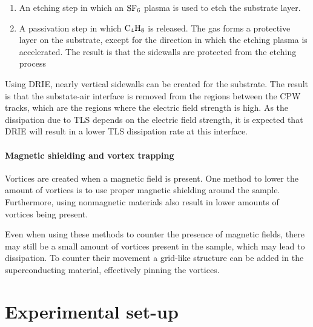   \begin{enumerate}
      \item An etching step in which an $\mathrm{SF_6}$ plasma is used to etch the substrate layer.
      \item A passivation step in which $\mathrm{C_4H_8}$ is released. The gas forms a protective layer on the substrate, except for the direction in which the etching plasma is accelerated. The result is that the sidewalls are protected from the etching process
  \end{enumerate}

  Using DRIE, nearly vertical sidewalls can be created for the substrate. The result is that the substate-air interface is removed from the regions between the CPW tracks, which are the regions where the electric field strength is high. As the dissipation due to TLS depends on the electric field strength, it is expected that DRIE will result in a lower TLS dissipation rate at this interface.

  \subsubsection{Magnetic shielding and vortex trapping}

  Vortices are created when a magnetic field is present. One method to lower the amount of vortices is to use proper magnetic shielding around the sample. Furthermore, using nonmagnetic materials also result in lower amounts of vortices being present.

  Even when using these methods to counter the presence of magnetic fields, there may still be a small amount of vortices present in the sample, which may lead to dissipation. To counter their movement a grid-like structure can be added in the superconducting material, effectively pinning the vortices.



\chapter{Experimental set-up}
  \label{ch:Experimental set-up}

